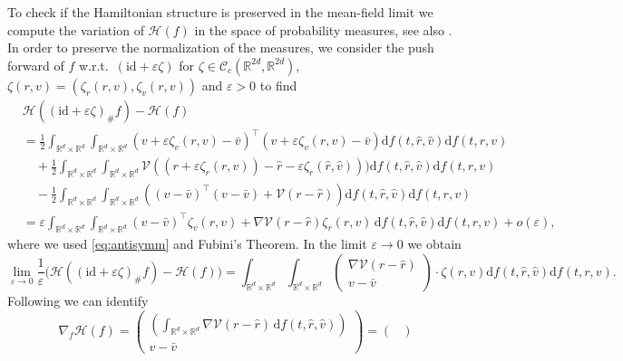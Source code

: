 \documentclass[11pt]{article}
\newcommand{\R}[0]{\mathbb R}
\newcommand{\calC}[0]{\mathcal C}
\newcommand{\calH}[0]{\mathcal H}
\newcommand{\dd}[0]{\mathrm d}
\newcommand{\V}[0]{\mathcal V}
\begin{document}
\begin{bibunit}[abbrv]
To check if the Hamiltonian structure is preserved in the mean-field limit we compute the variation of $\calH(f)$ in the space of probability measures, see also \cite{burger2021mean}. In order to preserve the normalization of the measures, we consider the push forward of $f$ w.r.t.~$(\text{id}+ \varepsilon \zeta)$ for $\zeta \in \calC_c(\mathbb R^{2d},\mathbb R^{2d})$, $\zeta(r,v)=(\zeta_r(r,v),\zeta_v(r,v)) $ and $\varepsilon > 0$ to find
\begin{align*}
&\calH((\text{id} +\varepsilon \zeta)_\#f) -\calH(f) \\
&
=\frac{1}{2} \int_{\mathbb R^d\times \mathbb R^d}\int_{\R^d \times \R^d}    \left(v+\varepsilon \zeta_v(r,v) - \bar v\right)^\top \left(v+\varepsilon \zeta_v(r,v) - \bar v\right)\dd f(t,\hat r,\hat v) \dd f(t,r,v)\\
&\quad +\frac{1}{2}\int_{\mathbb R^d\times \mathbb R^d}\int_{\R^d \times \R^d}  \V((r+\varepsilon \zeta_r(r,v))-\hat r-\varepsilon \zeta_{r}(\hat{r},\hat{v}))) \dd f(t,\hat r,\hat v) \dd f(t,r,v)\\
&\quad-\frac{1}{2}\int_{\mathbb R^d\times \mathbb R^d}\int_{\R^d \times \R^d} \left(   (v - \bar v)^\top (v - \bar v) + \V(r-\hat r)\right) \dd f(t,\hat r,\hat v) \dd f(t,r,v)
\\
&= \varepsilon \int_{\mathbb R^d\times \mathbb R^d}\int_{\R^d \times \R^d}  (v - \bar v)^\top \zeta_v(r,v) +\nabla \V(r-\hat r) \zeta_r(r,v) \, \dd f(t,\hat r,\hat v) \dd f(t,r,v) + o(\varepsilon),
\end{align*}
where we used \eqref{eq:antisymm} and Fubini's Theorem.
In the limit $\varepsilon\rightarrow 0$ we obtain 
\begin{equation*}
  \lim_{\varepsilon\rightarrow 0}  \frac{1}{\varepsilon} \Big(\calH((\text{id} +\varepsilon \zeta)_\#f) -\calH(f) \Big) = \int_{\mathbb R^d\times \mathbb R^d}\int_{\R^d \times \R^d} \begin{pmatrix}  \nabla \V(r-\hat r) \\ v - \bar v \end{pmatrix} \cdot \zeta(r,v) \dd f(t,\hat r,\hat v) \dd f(t,r,v).
\end{equation*}
Following \cite{ambrosio2005gradient} we can identify
\begin{equation}
\nabla_f \calH(f) = \begin{pmatrix}  
\left(\int_{\R^d \times \R^d} \nabla \V(r-\hat r) \, \dd f(t,\hat r,\hat v)\right)  \\  v-\bar v \end{pmatrix} = \begin{pmatrix}  

\end{pmatrix}
\end{equation}
\end{bibunit}
\end{document}
